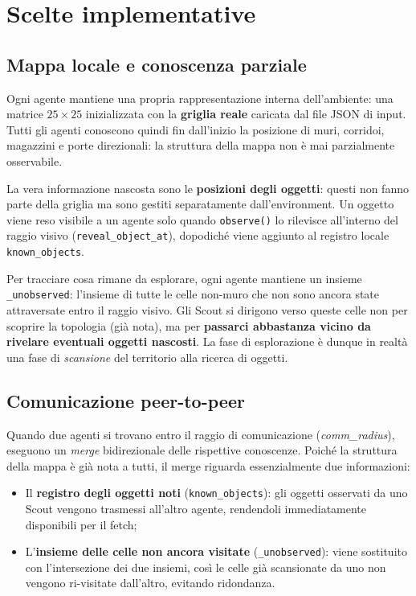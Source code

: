 \section{Scelte implementative}
\label{sec:implementazione}

\subsection{Mappa locale e conoscenza parziale}

Ogni agente mantiene una propria rappresentazione interna dell'ambiente: una matrice $25 \times 25$ inizializzata con la \textbf{griglia reale} caricata dal file JSON di input. Tutti gli agenti conoscono quindi fin dall'inizio la posizione di muri, corridoi, magazzini e porte direzionali: la struttura della mappa non è mai parzialmente osservabile.

La vera informazione nascosta sono le \textbf{posizioni degli oggetti}: questi non fanno parte della griglia ma sono gestiti separatamente dall'environment. Un oggetto viene reso visibile a un agente solo quando \texttt{observe()} lo rilevisce all'interno del raggio visivo (\texttt{reveal\_object\_at}), dopodiché viene aggiunto al registro locale \texttt{known\_objects}.

Per tracciare cosa rimane da esplorare, ogni agente mantiene un insieme \texttt{\_unobserved}: l'insieme di tutte le celle non-muro che non sono ancora state attraversate entro il raggio visivo. Gli Scout si dirigono verso queste celle non per scoprire la topologia (già nota), ma per \textbf{passarci abbastanza vicino da rivelare eventuali oggetti nascosti}. La fase di esplorazione è dunque in realtà una fase di \emph{scansione} del territorio alla ricerca di oggetti.

\subsection{Comunicazione peer-to-peer}

Quando due agenti si trovano entro il raggio di comunicazione (\emph{comm\_radius}), eseguono un \emph{merge} bidirezionale delle rispettive conoscenze. Poiché la struttura della mappa è già nota a tutti, il merge riguarda essenzialmente due informazioni:

\begin{itemize}
  \item Il \textbf{registro degli oggetti noti} (\texttt{known\_objects}): gli oggetti osservati da uno Scout vengono trasmessi all'altro agente, rendendoli immediatamente disponibili per il fetch;
  \item L'\textbf{insieme delle celle non ancora visitate} (\texttt{\_unobserved}): viene sostituito con l'intersezione dei due insiemi, così le celle già scansionate da uno non vengono ri-visitate dall'altro, evitando ridondanza.
\end{itemize}

